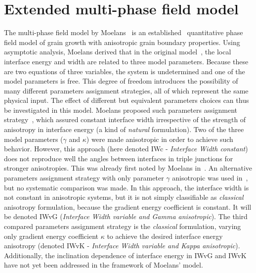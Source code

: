\chapter{Extended multi-phase field model}
\label{ch_PFMoelans}
The multi-phase field model by Moelans~\cite{Moelans2008} is an established~\cite{Miyoshi2020} quantitative phase field model of grain growth with anisotropic grain boundary properties. Using asymptotic analysis, Moelans derived that in the original model~\cite{Moelans2008}, the local interface energy and width are related to three model parameters. Because these are two equations of three variables, the system is undetermined and one of the model parameters is free. This degree of freedom introduces the possibility of many different parameters assignment strategies, all of which represent the same physical input. The effect of different but equivalent parameters choices can thus be investigated in this model. Moelans proposed such parameters assignment strategy~\cite{Moelans2008}, which assured constant interface width irrespective of the strength of anisotropy in interface energy (a kind of \textit{natural} formulation). Two of the three model parameters ($\gamma$ and $\kappa$) were made anisotropic in order to achieve such behavior. However, this approach (here denoted IWc - \textit{Interface Width constant}) does not reproduce well the angles between interfaces in triple junctions for stronger anisotropies. This was already first noted by Moelans in~\cite{Moelans2010}. An alternative parameters assignment strategy with only parameter $\gamma$ anisotropic was used in~\cite{Ravash2017,Miyoshi2020}, but no systematic comparison was made. In this approach, the interface width is not constant in anisotropic systems, but it is not simply classifiable as \textit{classical} anisotropy formulation, because the gradient energy coefficient is constant. It will be denoted IWvG (\textit{Interface Width variable and Gamma anisotropic}). The third compared parameters assignment strategy is the \textit{classical} formulation, varying only gradient energy coefficient $\kappa$ to achieve the desired interface energy anisotropy (denoted IWvK - \textit{Interface Width variable and Kappa anisotropic}). Additionally, the inclination dependence of interface energy in IWvG and IWvK have not yet been addressed in the framework of Moelans' model. 


